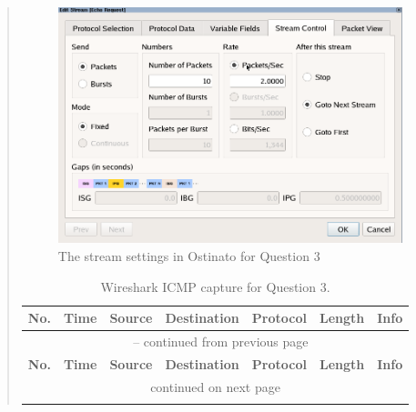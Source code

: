 \documentclass{article}
\newenvironment{ans}
   {\fbox{Answer}\begin{quote}\nopagebreak}
   {\end{quote}}
\newcommand\INFOCOLSIZE{13em}
\begin{document}
\begin{ans}
\begin{figure}[H]
   \centering
   \includegraphics[width=10cm]{data/q3-stream-settings.png}
   \caption{The stream settings in Ostinato for Question 3}
   \label{fig:stream-settings-q3}
\end{figure}

\begin{center}
\begin{longtable}{|l|l|l|l|l|l|p{\INFOCOLSIZE}|}
\caption{Wireshark ICMP capture for Question 3.}
\label{longtable:wireshark-cap-q3}\\
\hline 
\multicolumn{1}{|c|}{\textbf{No.}}&
\multicolumn{1}{c|}{\textbf{Time}}&
\multicolumn{1}{c|}{\textbf{Source}}&
\multicolumn{1}{c|}{\textbf{Destination}}&
\multicolumn{1}{c|}{\textbf{Protocol}}&
\multicolumn{1}{c|}{\textbf{Length}}&
\multicolumn{1}{c|}{\textbf{Info}}\\
\hline 
\endfirsthead

\multicolumn{7}{c}{\tablename\ \thetable{} -- continued from previous page}\\
\hline
\multicolumn{1}{|c|}{\textbf{No.}}&
\multicolumn{1}{c|}{\textbf{Time}}&
\multicolumn{1}{c|}{\textbf{Source}}&
\multicolumn{1}{c|}{\textbf{Destination}}&
\multicolumn{1}{c|}{\textbf{Protocol}}&
\multicolumn{1}{c|}{\textbf{Length}}&
\multicolumn{1}{c|}{\textbf{Info}}\\
\hline 
\endhead

\hline
\multicolumn{7}{|c|}{{continued on next page}}\\
\hline
\endfoot

\hline
\hline
\endlastfoot


\end{longtable}
\end{center}
\end{ans}
\end{document}

